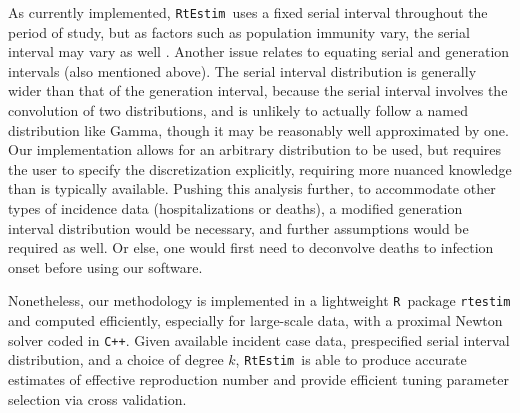 \documentclass[10pt,letterpaper]{article}
\newcommand{\R}{\texttt{R}}
\newcommand{\cpp}{\texttt{C++}}
\def\RtEstim{\texttt{RtEstim}}
\newcommand{\citep}[1]{\cite{#1}}
\begin{document}
As currently implemented, \RtEstim\ uses a fixed serial interval throughout the
period of study, but as factors such as population immunity vary, the serial
interval may vary as well \citep{nash2023estimating}.  
Another issue relates to equating serial and generation intervals (also
mentioned above). The serial interval distribution is generally wider than that
of the generation interval, because the serial interval involves the convolution
of two distributions, and is unlikely to actually follow a named distribution
like Gamma, though it may be reasonably well approximated by one. Our
implementation allows for an arbitrary distribution to be used, but requires the
user to specify the discretization explicitly, requiring more nuanced knowledge
than is typically available. Pushing this analysis further, to accommodate other
types of incidence data (hospitalizations or deaths), a modified generation
interval distribution would be necessary, and further assumptions would be
required as well. Or else, one would first need to deconvolve deaths to
infection onset before using our software.


Nonetheless, our methodology is implemented in a lightweight \R\ package 
\texttt{rtestim} and computed efficiently, especially for large-scale data, 
with a proximal Newton solver coded in \cpp. 
Given available incident case data, prespecified serial interval
distribution, and a choice of degree $k$, \RtEstim\ is able to produce
accurate estimates of effective reproduction number and provide efficient
tuning parameter selection via cross validation. 
\end{document}
